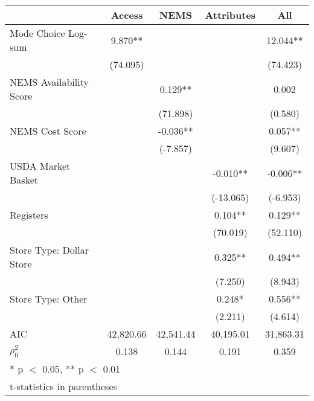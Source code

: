 \documentclass[
  letterpaper,
  number,
  review,
  3p]{elsarticle}
\providecommand{\DIFaddendFL}{} %
\DeclareRobustCommand{\DIFaddendFL}{\DIFOaddendFL \let\includegraphics\DIFOincludegraphics} %
\begin{document}
\begin{table}
{\centering
\begin{tabular}[t]{lcccc}
\toprule
  & Access & NEMS & Attributes & All\\
\midrule
Mode Choice Log-sum & 9.870** &  &  & 12.044**\\
 & (74.095) &  &  & (74.423)\\
NEMS Availability Score &  & 0.129** &  & 0.002\\
 &  & (71.898) &  & (0.580)\\
NEMS Cost Score &  & -0.036** &  & 0.057**\\
 &  & (-7.857) &  & (9.607)\\
USDA Market Basket &  &  & -0.010** & -0.006**\\
 &  &  & (-13.065) & (-6.953)\\
Registers &  &  & 0.104** & 0.129**\\
 &  &  & (70.019) & (52.110)\\
Store Type: Dollar Store &  &  & 0.325** & 0.494**\\
 &  &  & (7.250) & (8.943)\\
Store Type: Other &  &  & 0.248* & 0.556**\\
 &  &  & (2.211) & (4.614)\\
\midrule
AIC & 42,820.66 & 42,541.44 & 40,195.01 & 31,863.31\\
$\rho^2_0$ & 0.138 & 0.144 & 0.191 & 0.359\\
\bottomrule
\multicolumn{5}{l}{\rule{0pt}{1em}* p $<$ 0.05, ** p $<$ 0.01}\\
\multicolumn{5}{l}{\rule{0pt}{1em}t-statistics in parentheses}\\
\end{tabular}

}
\DIFaddendFL 

\end{table}%
\end{document}
